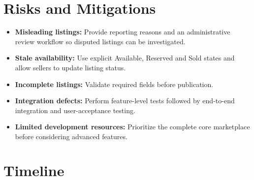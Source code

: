 \documentclass[11pt,a4paper]{article}
\begin{document}

\section{Risks and Mitigations}

\begin{itemize}

    \item \textbf{Misleading listings:}
    Provide reporting reasons and an administrative review workflow
    so disputed listings can be investigated.

    \item \textbf{Stale availability:}
    Use explicit Available, Reserved and Sold states and allow
    sellers to update listing status.

    \item \textbf{Incomplete listings:}
    Validate required fields before publication.

    \item \textbf{Integration defects:}
    Perform feature-level tests followed by end-to-end integration
    and user-acceptance testing.

    \item \textbf{Limited development resources:}
    Prioritize the complete core marketplace before considering
    advanced features.

\end{itemize}


\section{Timeline}
\end{document}
